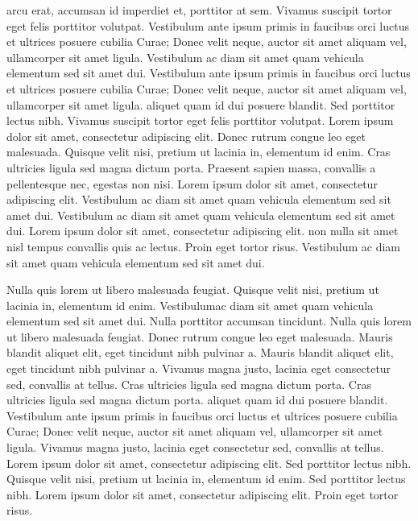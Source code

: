 \documentclass{article}
\begin{document}
 arcu erat, accumsan id imperdiet et, porttitor at sem. Vivamus suscipit tortor eget felis porttitor volutpat. Vestibulum ante ipsum primis in faucibus orci luctus et ultrices posuere cubilia Curae; Donec velit neque, auctor sit amet aliquam vel, ullamcorper sit amet ligula. Vestibulum ac diam sit amet quam vehicula elementum sed sit amet dui. Vestibulum ante ipsum primis in faucibus orci luctus et ultrices posuere cubilia Curae; Donec velit neque, auctor sit amet aliquam vel, ullamcorper sit amet ligula.  aliquet quam id dui posuere blandit. Sed porttitor lectus nibh. Vivamus suscipit tortor eget felis porttitor volutpat. Lorem ipsum dolor sit amet, consectetur adipiscing elit. Donec rutrum congue leo eget malesuada. Quisque velit nisi, pretium ut lacinia in, elementum id enim. Cras ultricies ligula sed magna dictum porta. Praesent sapien massa, convallis a pellentesque nec, egestas non nisi. Lorem ipsum dolor sit amet, consectetur adipiscing elit. Vestibulum ac diam sit amet quam vehicula elementum sed sit amet dui. Vestibulum ac diam sit amet quam vehicula elementum sed sit amet dui. Lorem ipsum dolor sit amet, consectetur adipiscing elit.  non nulla sit amet nisl tempus convallis quis ac lectus. Proin eget tortor risus. Vestibulum ac diam sit amet quam vehicula elementum sed sit amet dui.

Nulla quis lorem ut libero malesuada feugiat. Quisque velit nisi, pretium ut lacinia in, elementum id enim. Vestibulum\stopmsdata {}ac diam sit amet quam vehicula elementum sed sit amet dui. Nulla porttitor accumsan tincidunt. Nulla quis lorem ut libero malesuada feugiat. Donec rutrum congue leo eget malesuada. Mauris blandit aliquet elit, eget tincidunt nibh pulvinar a. Mauris blandit aliquet elit, eget tincidunt nibh pulvinar a. Vivamus magna justo, lacinia eget consectetur sed, convallis at tellus. Cras ultricies ligula sed magna dictum porta. Cras ultricies ligula sed magna dictum porta.  aliquet quam id dui posuere blandit. Vestibulum ante ipsum primis in faucibus orci luctus et ultrices posuere cubilia Curae; Donec velit neque, auctor sit amet aliquam vel, ullamcorper sit amet ligula. Vivamus magna justo, lacinia eget consectetur sed, convallis at tellus. Lorem ipsum dolor sit amet, consectetur adipiscing elit. Sed porttitor lectus nibh. Quisque velit nisi, pretium ut lacinia in, elementum id enim. Sed porttitor lectus nibh. Lorem ipsum dolor sit amet, consectetur adipiscing elit. Proin eget tortor risus.
\end{document}
